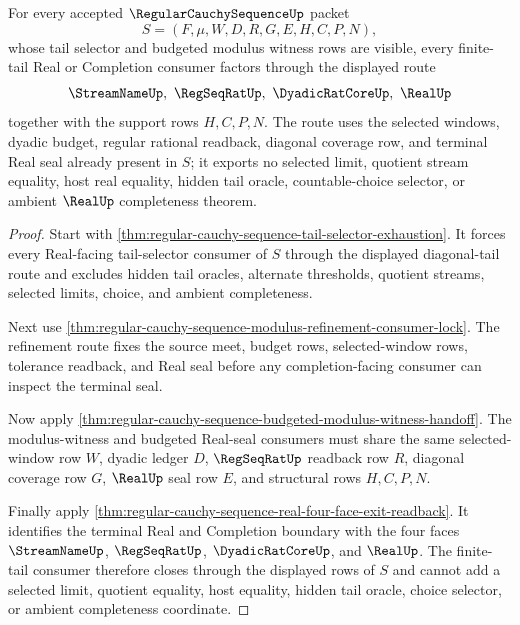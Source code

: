 \begin{theorem}
\label{thm:regular-cauchy-sequence-finite-tail-closure}
For every accepted $\RegularCauchySequenceUp$ packet
$$
S=(F,\mu,W,D,R,G,E,H,C,P,N),
$$
whose tail selector and budgeted modulus witness rows are visible, every finite-tail Real or Completion consumer factors through the displayed route
$$
\StreamNameUp,\ \RegSeqRatUp,\ \DyadicRatCoreUp,\ \RealUp
$$
together with the support rows $H,C,P,N$. The route uses the selected windows, dyadic budget, regular rational readback, diagonal coverage row, and terminal Real seal already present in $S$; it exports no selected limit, quotient stream equality, host real equality, hidden tail oracle, countable-choice selector, or ambient $\RealUp$ completeness theorem.
\end{theorem}
\begin{proof}
Start with \autoref{thm:regular-cauchy-sequence-tail-selector-exhaustion}. It forces every Real-facing tail-selector consumer of $S$ through the displayed diagonal-tail route and excludes hidden tail oracles, alternate thresholds, quotient streams, selected limits, choice, and ambient completeness.

Next use \autoref{thm:regular-cauchy-sequence-modulus-refinement-consumer-lock}. The refinement route fixes the source meet, budget rows, selected-window rows, tolerance readback, and Real seal before any completion-facing consumer can inspect the terminal seal.

Now apply \autoref{thm:regular-cauchy-sequence-budgeted-modulus-witness-handoff}. The modulus-witness and budgeted Real-seal consumers must share the same selected-window row $W$, dyadic ledger $D$, $\RegSeqRatUp$ readback row $R$, diagonal coverage row $G$, $\RealUp$ seal row $E$, and structural rows $H,C,P,N$.

Finally apply \autoref{thm:regular-cauchy-sequence-real-four-face-exit-readback}. It identifies the terminal Real and Completion boundary with the four faces $\StreamNameUp$, $\RegSeqRatUp$, $\DyadicRatCoreUp$, and $\RealUp$. The finite-tail consumer therefore closes through the displayed rows of $S$ and cannot add a selected limit, quotient equality, host equality, hidden tail oracle, choice selector, or ambient completeness coordinate.
\end{proof}


